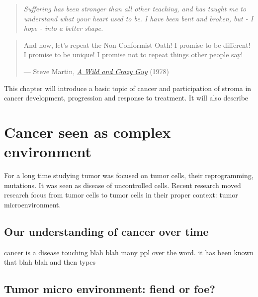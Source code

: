 \documentclass[12pt,]{book}
\theoremstyle{definition}
\theoremstyle{definition}
\theoremstyle{definition}
\theoremstyle{remark}
\begin{document}
\setcounter{page}{11}\vspace*{\fill}

\begin{quote}
 \emph{Suffering has been stronger than all other teaching, and has taught me to understand what your heart used to be. I have been bent and broken, but - I hope - into a better shape.}
 \end{quote}

\vspace*{\fill}

\begin{quote}
And now, let's repeat the Non-Conformist Oath! I promise to be
different! I promise to be unique! I promise not to repeat things other
people say!

--- Steve Martin,
\href{https://en.wikipedia.org/wiki/A_Wild_and_Crazy_Guy}{\emph{A Wild
and Crazy Guy}} (1978)
\end{quote}

This chapter will introduce a basic topic of cancer and participation of
stroma in cancer development, progression and response to treatment. It
will also describe

\hypertarget{cancer-seen-as-complex-environment}{%
\section{Cancer seen as complex
environment}\label{cancer-seen-as-complex-environment}}

For a long time studying tumor was focused on tumor cells, their
reprogramming, mutations. It was seen as disease of uncontrolled cells.
Recent research moved research focus from tumor cells to tumor cells in
their proper context: tumor microenvironment.

\hypertarget{our-understanding-of-cancer-over-time}{%
\subsection{Our understanding of cancer over
time}\label{our-understanding-of-cancer-over-time}}

cancer is a disease touching blah blah many ppl over the word. it has
been known that blah blah and then types

\hypertarget{tumor-micro-environment-fiend-or-foe}{%
\subsection{Tumor micro environment: fiend or
foe?}\label{tumor-micro-environment-fiend-or-foe}}
\end{document}
